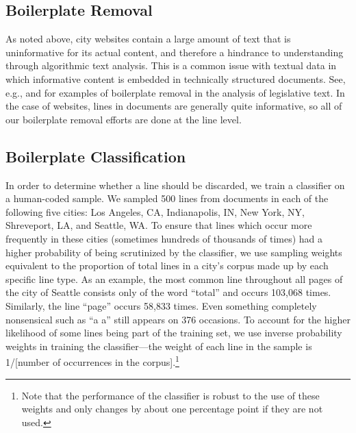 \documentclass[11pt]{article}
\begin{document}
\subsection{Boilerplate Removal}\label{boilerplate}
As noted above, city websites contain a large amount of text that is uninformative for its actual content, and therefore a hindrance to understanding through algorithmic text analysis. This is a common issue with textual data in which informative content is embedded in technically structured documents. See, e.g., \citet{burgess2016legislative,wilkerson2015tracing} and \citet{linder2018text} for examples of boilerplate removal in the analysis of legislative text. In the case of websites, lines in documents are generally quite informative, so all of our boilerplate removal efforts are done at the line level.


\subsection*{Boilerplate Classification}
In order to determine whether a line should be discarded, we train a classifier on a human-coded sample. We sampled 500 lines from documents in each of the following five cities: Los Angeles, CA, Indianapolis, IN, New York, NY, Shreveport, LA, and Seattle, WA. To ensure that lines which occur more frequently in these cities (sometimes hundreds of thousands of times) had a higher probability of being scrutinized by the classifier, we use sampling weights equivalent to the proportion of total lines in a city's corpus made up by each specific line type. As an example, the most common line throughout all pages of the city of Seattle consists only of the word ``total'' and occurs 103,068 times. Similarly, the line ``page'' occurs 58,833 times. Even something completely nonsensical such as ``a a'' still appears on 376 occasions. To account for the higher likelihood of some lines being part of the training set, we use inverse probability weights in training the classifier---the weight of each line in the sample is 1/[number of occurrences in the corpus].\footnote{Note that the performance of the classifier is robust to the use of these weights and only changes by about one percentage point if they are not used.}
\end{document}

